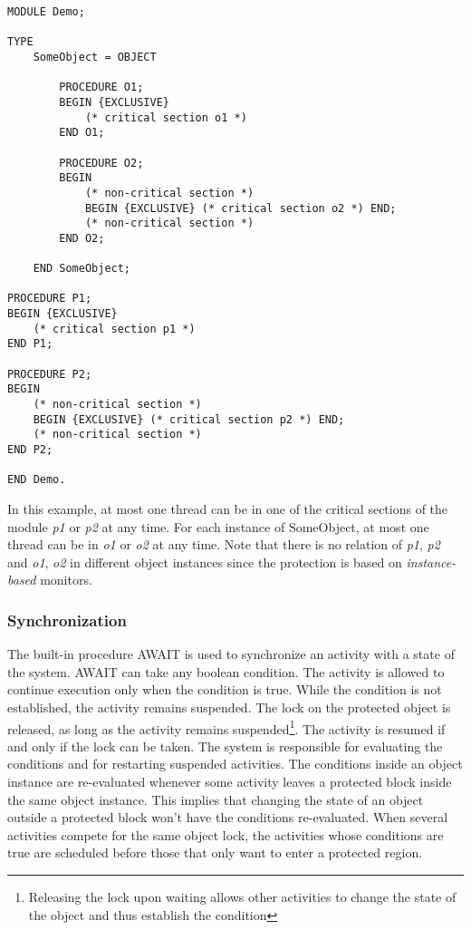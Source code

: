 \documentclass[a4paper,11pt]{article}
\begin{document}
\begin{lstlisting}[language=Oberon,frame=none,caption=Usage of exclusive blocks]
MODULE Demo;

TYPE
    SomeObject = OBJECT

        PROCEDURE O1;
        BEGIN {EXCLUSIVE}
            (* critical section o1 *)
        END O1;

        PROCEDURE O2;
        BEGIN
            (* non-critical section *)
            BEGIN {EXCLUSIVE} (* critical section o2 *) END;
            (* non-critical section *)
        END O2;

    END SomeObject;

PROCEDURE P1;
BEGIN {EXCLUSIVE}
    (* critical section p1 *)
END P1;

PROCEDURE P2;
BEGIN
    (* non-critical section *)
    BEGIN {EXCLUSIVE} (* critical section p2 *) END;
    (* non-critical section *)
END P2;

END Demo.
\end{lstlisting}

In this example, at most one thread can be in one of the critical sections of the module \emph{p1} or \emph{p2} at any time. For each instance of SomeObject, at most one thread can be in \emph{o1} or \emph{o2} at any time. Note that there is no relation of \emph{p1}, \emph{p2} and \emph{o1}, \emph{o2} in different object instances since the protection is based on \emph{instance-based} monitors.

\subsubsection{Synchronization}
The built-in procedure AWAIT is used to synchronize an activity with a state of the system. AWAIT can take any boolean condition. The activity is allowed to continue execution only when the condition is true. While the condition is not established, the activity remains suspended. The lock on the protected object is released, as long as the activity remains suspended\footnote{Releasing the lock upon waiting allows other activities to change the state of the object and thus establish the condition}. The activity is resumed if and only if the lock can be taken. The system is responsible for evaluating the conditions and for restarting suspended activities. The conditions inside an object instance are re-evaluated whenever some activity leaves a protected block inside the same object instance.
This implies that changing the state of an object outside a protected block won't have the conditions re-evaluated.
When several activities compete for the same object lock, the activities whose conditions are true are scheduled before those that only want to enter a protected region.
\end{document}
